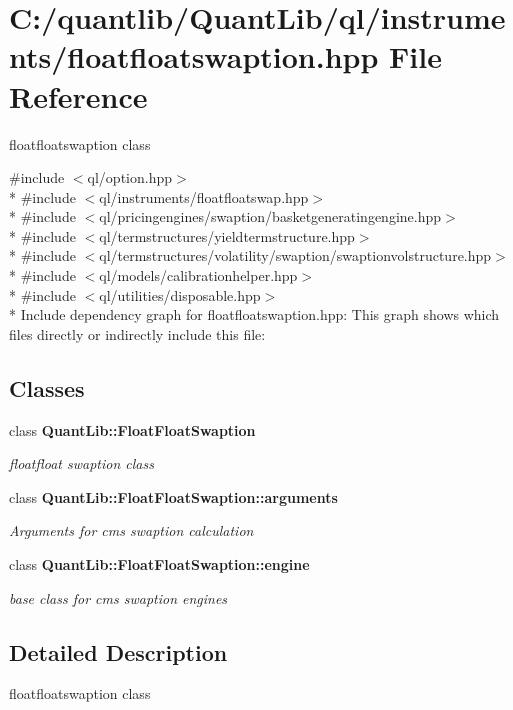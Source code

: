 \section{C\+:/quantlib/\+Quant\+Lib/ql/instruments/floatfloatswaption.hpp File Reference}
\label{floatfloatswaption_8hpp}


floatfloatswaption class  


{\ttfamily \#include $<$ql/option.\+hpp$>$}\\*
{\ttfamily \#include $<$ql/instruments/floatfloatswap.\+hpp$>$}\\*
{\ttfamily \#include $<$ql/pricingengines/swaption/basketgeneratingengine.\+hpp$>$}\\*
{\ttfamily \#include $<$ql/termstructures/yieldtermstructure.\+hpp$>$}\\*
{\ttfamily \#include $<$ql/termstructures/volatility/swaption/swaptionvolstructure.\+hpp$>$}\\*
{\ttfamily \#include $<$ql/models/calibrationhelper.\+hpp$>$}\\*
{\ttfamily \#include $<$ql/utilities/disposable.\+hpp$>$}\\*
Include dependency graph for floatfloatswaption.\+hpp\+:
This graph shows which files directly or indirectly include this file\+:
\subsection*{Classes}
\begin{DoxyCompactItemize}
\item 
class {\bf Quant\+Lib\+::\+Float\+Float\+Swaption}
\begin{DoxyCompactList}\small\item\em floatfloat swaption class \end{DoxyCompactList}\item 
class {\bf Quant\+Lib\+::\+Float\+Float\+Swaption\+::arguments}
\begin{DoxyCompactList}\small\item\em Arguments for cms swaption calculation \end{DoxyCompactList}\item 
class {\bf Quant\+Lib\+::\+Float\+Float\+Swaption\+::engine}
\begin{DoxyCompactList}\small\item\em base class for cms swaption engines \end{DoxyCompactList}\end{DoxyCompactItemize}


\subsection{Detailed Description}
floatfloatswaption class 


